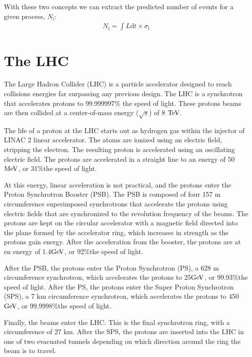 With these two concepts we can extract the predicted number of events for a given process, $N_{\mathrm{i}}$: 
\begin{eqnarray}
N_{\mathrm{i}} = \int L \mathrm{d}t \times \sigma_{\mathrm{i}} 
\label{eqn:Nevents}
\end{eqnarray}  

\section{The LHC}
The Large Hadron Collider (LHC) is a particle accelerator designed to reach collisions energies far surpassing any previous design.  
The LHC is a synchrotron that accelerates protons to 99.999997\% the speed of light.  
These protons beams are then collided at a center-of-mass energy ($\sqrt{s}$) of 8 $\mathrm{TeV}$.  


The life of a proton at the LHC starts out as hydrogen gas within the injector of LINAC 2 linear accelerator.  
The atoms are ionized using an electric field, stripping the electron.  
The resulting proton is accelerated using an oscillating electric field.  
The protons are accelerated in a straight line to an energy of 50$\mathrm{MeV}$, or 31\%the speed of light.  

At this energy, linear acceleration is not practical, and the protons enter the Proton Synchrotron Booster (PSB).  
The PSB is composed of four 157 m circumference superimposed synchrotrons that accelerate the protons using electric fields that are synchronized to the revolution frequency of the beams.  
The protons are kept on the circular accelerator with a magnetic field directed into the plane formed by the accelerator ring, which increases in strength as the protons gain energy.  
After the acceleration from the booster, the protons are at en energy of 1.4$\mathrm{GeV}$, or 92\%the speed of light.

After the PSB, the protons enter the Proton Synchrotron (PS), a 628 m circumference synchrotron, which accelerates the protons to 25$\mathrm{GeV}$, or 99.93\%the speed of light.  
After the PS, the protons enter the Super Proton Synchrotron (SPS), a 7 km circumference synchrotron, which accelerates the protons to 450$\mathrm{GeV}$, or 99.9998\%the speed of light.

Finally, the beams enter the LHC.  This is the final synchrotron ring, with a circumference of 27 km.  
After the SPS, the protons are inserted into the LHC in one of two evacuated tunnels depending on which direction around the ring the beam is to travel.  

